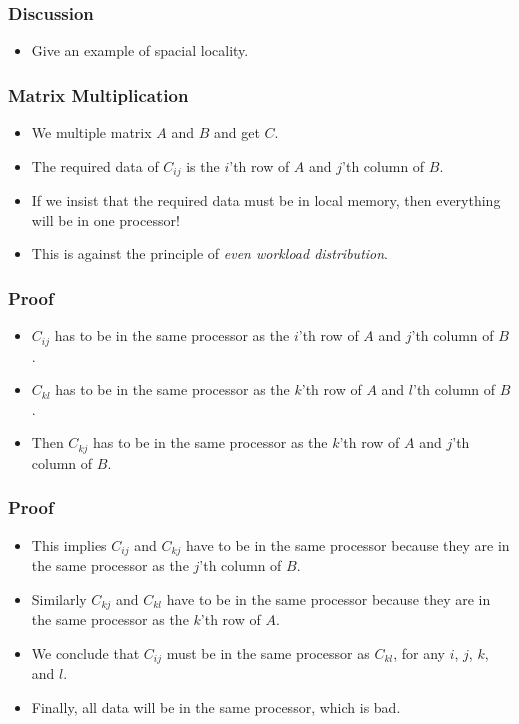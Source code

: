 \documentclass{beamer}
\begin{document}
\begin{CJK}{UTF8}{bsmi}
\begin{frame}
\frametitle{Discussion}
\begin{itemize}
\item Give an example of spacial locality.
\end{itemize}
\end{frame}

\begin{frame}
\frametitle{Matrix Multiplication}
\begin{itemize}
\item We multiple matrix $A$ and $B$ and get $C$.
\item The required data of $C_{ij}$ is the $i$'th row of $A$ and $j$'th column of $B$.  
\item If we insist that the required data must be in local memory, then everything will be in one processor!
\item This is against the principle of {\em even workload distribution}.
\end{itemize}
\end{frame}

\begin{frame}
\frametitle{Proof}
\begin{itemize}
\item $C_{ij}$ has to be in the same processor as the $i$'th row of $A$ and $j$'th column of $B$.
\item $C_{kl}$ has to be in the same processor as the $k$'th row of $A$ and $l$'th column of $B$.
\item Then $C_{kj}$ has to be in the same processor as the $k$'th row of $A$ and $j$'th column of $B$.
\end{itemize}
\end{frame}

\begin{frame}
\frametitle{Proof}
\begin{itemize}
\item This implies $C_{ij}$ and $C_{kj}$ have to be in the same processor because they are in the same processor as the $j$'th column of $B$.
\item Similarly $C_{kj}$ and $C_{kl}$ have to be in the same processor because they are in the same processor as the $k$'th row of $A$.
\item We conclude that $C_{ij}$ must be in the same processor as $C_{kl}$, for any $i$, $j$, $k$, and $l$.
\item Finally, all data will be in the same processor, which is bad.
\end{itemize}
\end{frame}


\end{CJK}
\end{document}
